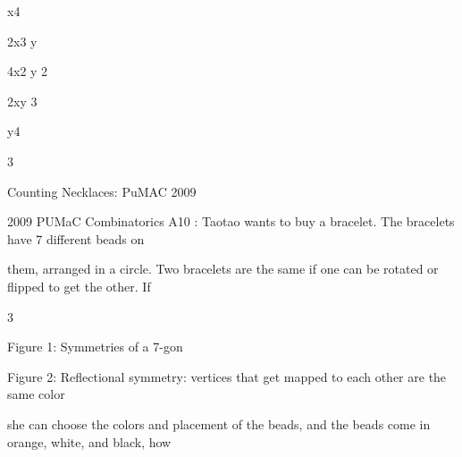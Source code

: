 \documentclass[a4paper,portrait,12pt]{article}
\begin{document}
\begin{flushleft}
x4
\end{flushleft}


\begin{flushleft}
2x3 y
\end{flushleft}


\begin{flushleft}
4x2 y 2
\end{flushleft}


\begin{flushleft}
2xy 3
\end{flushleft}


\begin{flushleft}
y4
\end{flushleft}





3





\begin{flushleft}
Counting Necklaces: PuMAC 2009
\end{flushleft}





\begin{flushleft}
2009 PUMaC Combinatorics A10 : Taotao wants to buy a bracelet. The bracelets have 7 different beads on
\end{flushleft}


\begin{flushleft}
them, arranged in a circle. Two bracelets are the same if one can be rotated or flipped to get the other. If
\end{flushleft}


3





\begin{flushleft}
\newpage
Figure 1: Symmetries of a 7-gon
\end{flushleft}





\begin{flushleft}
Figure 2: Reflectional symmetry: vertices that get mapped to each other are the same color
\end{flushleft}


\begin{flushleft}
she can choose the colors and placement of the beads, and the beads come in orange, white, and black, how
\end{flushleft}
\end{document}
